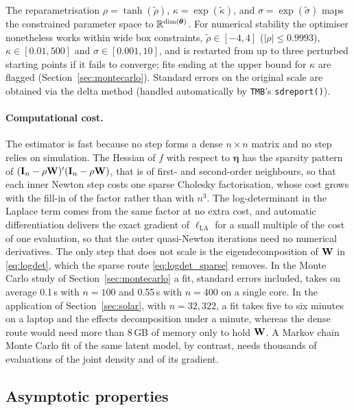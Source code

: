 The reparametrisation $\rho = \tanh(\tilde{\rho})$, $\kappa = \exp(\tilde{\kappa})$, and $\sigma = \exp(\tilde{\sigma})$ maps the constrained parameter space to $\mathbb{R}^{\dim(\boldsymbol{\theta})}$. For numerical stability the optimiser nonetheless works within wide box constraints, $\tilde\rho\in[-4,4]$ ($|\rho|\le0.9993$), $\kappa\in[0.01,500]$ and $\sigma\in[0.001,10]$, and is restarted from up to three perturbed starting points if it fails to converge; fits ending at the upper bound for $\kappa$ are flagged (Section~\ref{sec:montecarlo}).
Standard errors on the original scale are obtained via the delta method (handled automatically by \texttt{TMB}'s \texttt{sdreport()}).

\paragraph{Computational cost.}
The estimator is fast because no step forms a dense $n\times n$ matrix and no step relies on simulation.
The Hessian of $f$ with respect to $\boldsymbol{\eta}$ has the sparsity pattern of $(\mathbf{I}_n-\rho\mathbf{W})'(\mathbf{I}_n-\rho\mathbf{W})$, that is of first- and second-order neighbours, so that each inner Newton step costs one sparse Cholesky factorisation, whose cost grows with the fill-in of the factor rather than with $n^3$.
The log-determinant in the Laplace term comes from the same factor at no extra cost, and automatic differentiation delivers the exact gradient of $\ell_{\mathrm{LA}}$ for a small multiple of the cost of one evaluation, so that the outer quasi-Newton iterations need no numerical derivatives.
The only step that does not scale is the eigendecomposition of $\mathbf{W}$ in \eqref{eq:logdet}, which the sparse route \eqref{eq:logdet_sparse} removes.
In the Monte Carlo study of Section~\ref{sec:montecarlo} a fit, standard errors included, takes on average 0.1\,s with $n=100$ and 0.55\,s with $n=400$ on a single core.
In the application of Section~\ref{sec:solar}, with $n = 32{,}322$, a fit takes five to six minutes on a laptop and the effects decomposition under a minute, whereas the dense route would need more than 8\,GB of memory only to hold $\mathbf{W}$.
A Markov chain Monte Carlo fit of the same latent model, by contrast, needs thousands of evaluations of the joint density and of its gradient.

\subsection{Asymptotic properties}\label{sec:est_asymptotics}

